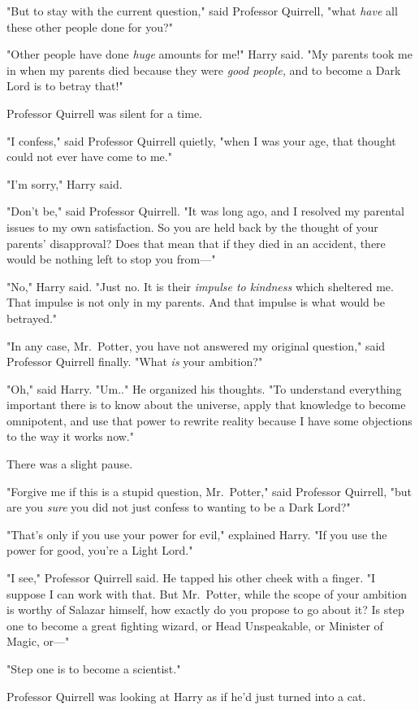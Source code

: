 "But to stay with the current question," said Professor Quirrell, "what
\emph{have} all these other people done for you?"

"Other people have done \emph{huge} amounts for me!" Harry said. "My parents
took me in when my parents died because they were \emph{good people,} and to
become a Dark Lord is to betray that!"

Professor Quirrell was silent for a time.

"I confess," said Professor Quirrell quietly, "when I was your age, that
thought could not ever have come to me."

"I'm sorry," Harry said.

"Don't be," said Professor Quirrell. "It was long ago, and I resolved my
parental issues to my own satisfaction. So you are held back by the thought of
your parents' disapproval? Does that mean that if they died in an accident,
there would be nothing left to stop you from---"

"No," Harry said. "Just no. It is their \emph{impulse to kindness} which
sheltered me. That impulse is not only in my parents. And that impulse is what
would be betrayed."

"In any case, Mr.~Potter, you have not answered my original question," said
Professor Quirrell finally. "What \emph{is} your ambition?"

"Oh," said Harry. "Um.." He organized his thoughts. "To understand everything
important there is to know about the universe, apply that knowledge to become
omnipotent, and use that power to rewrite reality because I have some
objections to the way it works now."

There was a slight pause.

"Forgive me if this is a stupid question, Mr.~Potter," said Professor Quirrell,
"but are you \emph{sure} you did not just confess to wanting to be a Dark Lord?"

"That's only if you use your power for evil," explained Harry. "If you use the
power for good, you're a Light Lord."

"I see," Professor Quirrell said. He tapped his other cheek with a finger. "I
suppose I can work with that. But Mr.~Potter, while the scope of your ambition
is worthy of Salazar himself, how exactly do you propose to go about it? Is
step one to become a great fighting wizard, or Head Unspeakable, or Minister of
Magic, or---"

"Step one is to become a scientist."

Professor Quirrell was looking at Harry as if he'd just turned into a cat.

